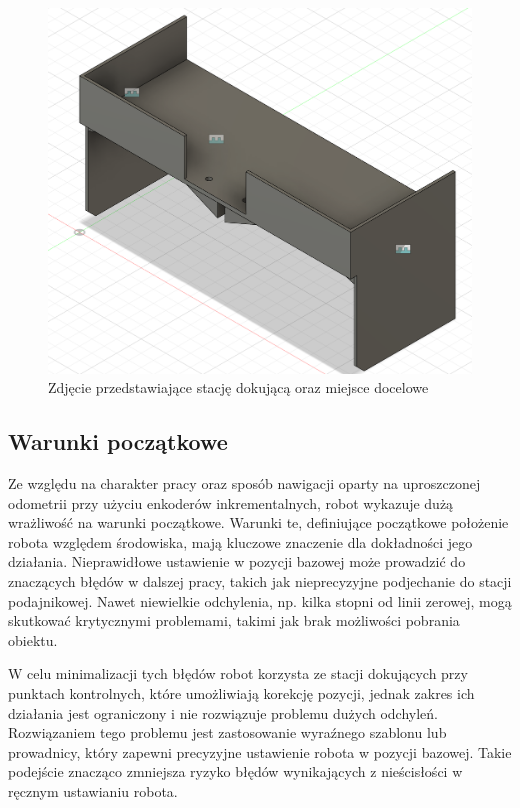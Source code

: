 \begin{figure}
    \centering
    \includegraphics[width=1.0\textwidth]{./graf/upper.png}
    \caption{Zdjęcie przedstawiające stację dokującą oraz miejsce docelowe}
    \label{fig:stacja}
\end{figure}

\subsection{Warunki początkowe}

Ze względu na charakter pracy oraz sposób nawigacji oparty na uproszczonej odometrii przy użyciu enkoderów inkrementalnych, robot wykazuje dużą wrażliwość na warunki początkowe. Warunki te, definiujące początkowe położenie robota względem środowiska, mają kluczowe znaczenie dla dokładności jego działania. Nieprawidłowe ustawienie w pozycji bazowej może prowadzić do znaczących błędów w dalszej pracy, takich jak nieprecyzyjne podjechanie do stacji podajnikowej. Nawet niewielkie odchylenia, np. kilka stopni od linii zerowej, mogą skutkować krytycznymi problemami, takimi jak brak możliwości pobrania obiektu.

W celu minimalizacji tych błędów robot korzysta ze stacji dokujących przy punktach kontrolnych, które umożliwiają korekcję pozycji, jednak zakres ich działania jest ograniczony i nie rozwiązuje problemu dużych odchyleń. Rozwiązaniem tego problemu jest zastosowanie wyraźnego szablonu lub prowadnicy, który zapewni precyzyjne ustawienie robota w pozycji bazowej. Takie podejście znacząco zmniejsza ryzyko błędów wynikających z nieścisłości w ręcznym ustawianiu robota.

